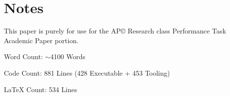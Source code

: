 \section*{Notes}
This paper is purely for use for the AP© Research class Performance Task Academic Paper portion.

Word Count: $\sim$4100 Words

Code Count: 881 Lines (428 Executable + 453 Tooling)

LaTeX Count: 534 Lines
